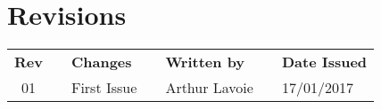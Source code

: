 \newpage
\section{Revisions}
\begin{table}[H]
    \centering
    \begin{tabular}{cllllll}\toprule
         \textbf{Rev} & \phantom{a} &\textbf{Changes} & \phantom{a} & \textbf{Written by} & \phantom{a} & \textbf{Date Issued} \\
        \cmidrule{3-7}
        01 & & First Issue & & Arthur Lavoie & & 17/01/2017 \\
        \bottomrule
    \end{tabular}
\end{table}